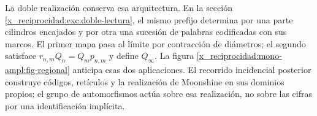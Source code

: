 La doble realización conserva esa arquitectura. En la sección
\ref{x_reciprocidad:exc:doble-lectura}, el mismo prefijo determina por una parte cilindros
encajados y por otra una sucesión de palabras codificadas con sus marcos.
El primer mapa pasa al límite por contracción de diámetros; el segundo
satisface \(r_{n,m}Q_n=Q_mp_{n,m}\) y define \(Q_\infty\).
La figura \ref{x_reciprocidad:mono-ampl:fig-regional} anticipa esas dos aplicaciones.
El recorrido incidencial posterior construye códigos, retículos y la
realización de Moonshine en sus dominios propios; el grupo de automorfismos
actúa sobre esa realización, no sobre las cifras por una identificación
implícita.


